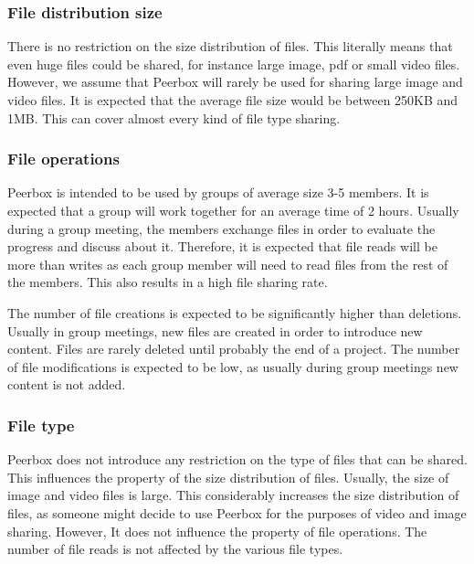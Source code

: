 \subsubsection{File distribution size}

There is no restriction on the size distribution of files. This literally means that even huge files could be shared, for instance large image, pdf or small video files. However, we assume that Peerbox will rarely be used for sharing large image and video files. It is expected that the average file size would be between 250KB and 1MB. This can cover almost every kind of file type sharing.

\subsubsection{File operations}

Peerbox is intended to be used by groups of average size 3-5 members. It is expected that a group will work together for an average time of 2 hours. Usually during a group meeting, the members exchange files in order to evaluate the progress and discuss about it. Therefore, it is expected that file reads will be more than writes as each group member will need to read files from the rest of the members. This also results in a high file sharing rate.

The number of file creations is expected to be significantly higher than deletions. Usually in group meetings, new files are created in order to introduce new content. Files are rarely deleted until probably the end of a project. The number of file modifications is expected to be low, as usually during group meetings new content is not added.

\subsubsection{File type}

Peerbox does not introduce any restriction on the type of files that can be shared. This influences the property of the size distribution of files. Usually, the size of image and video files is large. This considerably increases the size distribution of files, as someone might decide to use Peerbox for the purposes of video and image sharing. However, It does not influence the property of file operations. The number of file reads is not affected by the various file types.